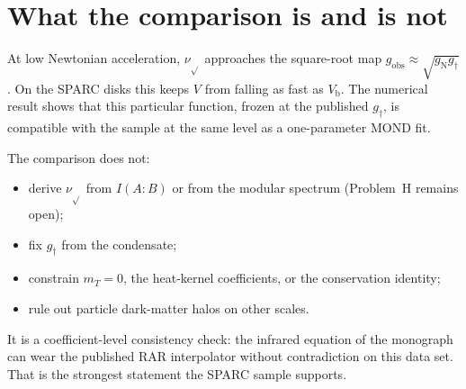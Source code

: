 \section{What the comparison is and is not}
\label{sec:sparc-status}

At low Newtonian acceleration,
\(\nu_{\sqrt{}}\) approaches the square-root map
\(g_{\mathrm{obs}}\approx\sqrt{g_{\mathrm{N}}g_\dagger}\).
On the SPARC disks this keeps \(V\) from falling as fast as
\(V_{\mathrm{b}}\). The numerical result shows that this
particular function, frozen at the published \(g_\dagger\),
is compatible with the sample at the same level as a
one-parameter MOND fit.

The comparison does not:
\begin{itemize}
  \item derive \(\nu_{\sqrt{}}\) from \(I(A:B)\) or from the
        modular spectrum (Problem~H remains open);
  \item fix \(g_\dagger\) from the condensate;
  \item constrain \(m_T=0\), the heat-kernel coefficients, or
        the conservation identity;
  \item rule out particle dark-matter halos on other scales.
\end{itemize}

It is a coefficient-level consistency check: the infrared
equation of the monograph can wear the published RAR
interpolator without contradiction on this data set. That is
the strongest statement the SPARC sample supports.